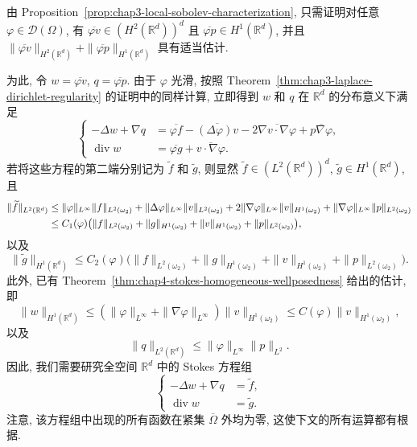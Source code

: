 \begin{Proof}
由 Proposition~\ref{prop:chap3-local-sobolev-characterization}, 只需证明对任意 $\varphi\in\mathcal D(\Omega)$, 有 $\overline{\varphi v}\in(H^2(\mathbb R^d))^d$ 且 $\overline{\varphi p}\in H^1(\mathbb R^d)$, 并且 $\|\overline{\varphi v}\|_{H^2(\mathbb R^d)}+\|\overline{\varphi p}\|_{H^1(\mathbb R^d)}$ 具有适当估计.

为此, 令 $w=\overline{\varphi v}$, $q=\overline{\varphi p}$. 由于 $\varphi$ 光滑, 按照 Theorem~\ref{thm:chap3-laplace-dirichlet-regularity} 的证明中的同样计算, 立即得到 $w$ 和 $q$ 在 $\mathbb R^d$ 的分布意义下满足
\[
 \left\{
 \begin{aligned}
  -\Delta w+\nabla q&=\overline{\varphi f}-\overline{(\Delta\varphi)v}
  -2\overline{\nabla v\cdot\nabla\varphi}+\overline{p\nabla\varphi},\\
  \operatorname{div}w&=\overline{\varphi g}+\overline{v\cdot\nabla\varphi}.
 \end{aligned}
 \right.
\]
若将这些方程的第二端分别记为 $\widetilde f$ 和 $\widetilde g$, 则显然 $\widetilde f\in(L^2(\mathbb R^d))^d$, $\widetilde g\in H^1(\mathbb R^d)$, 且
\begin{align}
 \|\widetilde f\|_{L^2(\mathbb R^d)}
 &\leq \|\varphi\|_{L^\infty}\|f\|_{L^2(\omega_2)}
 +\|\Delta\varphi\|_{L^\infty}\|v\|_{L^2(\omega_2)}
 +2\|\nabla\varphi\|_{L^\infty}\|v\|_{H^1(\omega_2)}
 +\|\nabla\varphi\|_{L^\infty}\|p\|_{L^2(\omega_2)}
 \notag\\
 &\leq C_1(\varphi)\bigl(\|f\|_{L^2(\omega_2)}+\|g\|_{H^1(\omega_2)}
 +\|v\|_{H^1(\omega_2)}+\|p\|_{L^2(\omega_2)}\bigr),
 \label{eq:chap4-localized-stokes-f-bound}
\end{align}
以及
\begin{equation}
 \|\widetilde g\|_{H^1(\mathbb R^d)}
 \leq C_2(\varphi)\bigl(\|f\|_{L^2(\omega_2)}+\|g\|_{H^1(\omega_2)}
 +\|v\|_{H^1(\omega_2)}+\|p\|_{L^2(\omega_2)}\bigr).
 \label{eq:chap4-localized-stokes-g-bound}
\end{equation}
此外, 已有 Theorem~\ref{thm:chap4-stokes-homogeneous-wellposedness} 给出的估计, 即
\begin{equation}
 \|w\|_{H^1(\mathbb R^d)}
 \leq(\|\varphi\|_{L^\infty}+\|\nabla\varphi\|_{L^\infty})\|v\|_{H^1(\omega_2)}
 \leq C(\varphi)\|v\|_{H^1(\omega_2)},
 \label{eq:chap4-localized-stokes-w-bound}
\end{equation}
以及
\begin{equation}
 \|q\|_{L^2(\mathbb R^d)}\leq\|\varphi\|_{L^\infty}\|p\|_{L^2}.
 \label{eq:chap4-localized-stokes-q-bound}
\end{equation}
因此, 我们需要研究全空间 $\mathbb R^d$ 中的 Stokes 方程组
\begin{equation}
 \left\{
 \begin{aligned}
  -\Delta w+\nabla q&=\widetilde f,\\
  \operatorname{div}w&=\widetilde g.
 \end{aligned}
 \right.
 \label{eq:chap4-whole-space-localized-stokes}
\end{equation}
注意, 该方程组中出现的所有函数在紧集 $\overline\Omega$ 外均为零, 这使下文的所有运算都有根据.


\end{Proof}
